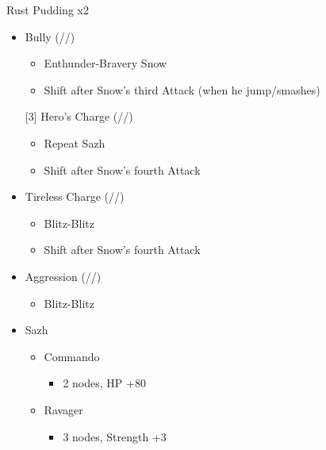 \renewcommand{\first}{[1] }
\renewcommand{\second}{[2] Tireless Charge (\com/\med/\com)}
\renewcommand{\third}{[3] Hero's Charge (\syn/\med/\com)}
\renewcommand{\fourth}{[4] }
\renewcommand{\fifth}{[5] Bully (\syn/\sab/\com)}
\renewcommand{\sixth}{[6] Aggression (\com/\rav/\com)}
\begin{multicols}{2}
\begin{battle}{Rust Pudding x2}
\begin{itemize}
    \item \fifth
    \begin{itemize}
        \item Enthunder-Bravery Snow
        \item Shift after Snow's third Attack (when he jump/smashes)
    \end{itemize}
    \third
    \begin{itemize}
        \item Repeat Sazh
        \item Shift after Snow's fourth Attack
    \end{itemize}
    \item \second
    \begin{itemize}
        \item Blitz-Blitz
        \item Shift after Snow's fourth Attack
    \end{itemize}
    \item \sixth
    \begin{itemize}
        \item Blitz-Blitz
    \end{itemize}
\end{itemize}
\end{battle}
\begin{menu}
\begin{itemize}
    \crystarium
    \begin{itemize}
        \item Sazh
        \begin{itemize}
            \item Commando
            \begin{itemize}
                \item 2 nodes, HP +80
            \end{itemize}
            \item Ravager
            \begin{itemize}
                \item 3 nodes, Strength +3

\end{itemize}
\end{itemize}
\end{itemize}
\end{itemize}
\end{menu}
\end{multicols}

